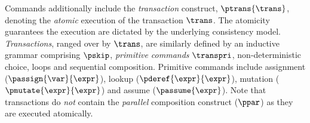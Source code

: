 Commands additionally include the \emph{transaction} construct, $\ptrans{\trans}$, denoting the \emph{atomic} execution of the transaction $\trans$. 
The atomicity guarantees the execution are dictated by the underlying consistency model.
\emph{Transactions}, ranged over by $\trans$, are similarly defined by an inductive grammar comprising $\pskip$, \emph{primitive commands} \( \transpri \), non-deterministic choice, loops and sequential composition.
Primitive commands include assignment (\( \passign{\var}{\expr}\)), lookup (\( \pderef{\expr}{\expr}\)), mutation (\( \pmutate{\expr}{\expr}\)) and assume (\( \passume{\expr}\)). 
Note that transactions do \emph{not} contain the \emph{parallel} composition construct ($\ppar$) as they are executed atomically.




